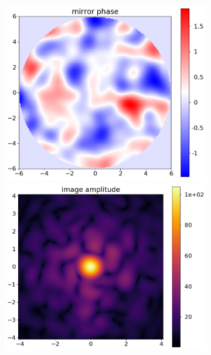 \documentclass{article}
\begin{document}
\begin{figure}
    \begin{subfigure}{0.5\textwidth}
        \begin{minipage}{0.5\textwidth}
            \centering
            \includegraphics[width=\textwidth]{pictures/error_pics/errors4in_phase.png}
        \end{minipage}%
        \begin{minipage}{0.5\textwidth}
            \centering
            \includegraphics[width=\textwidth]{pictures/error_pics/errors4out_abs.png}

\end{minipage}
\end{subfigure}
\end{figure}
\end{document}
